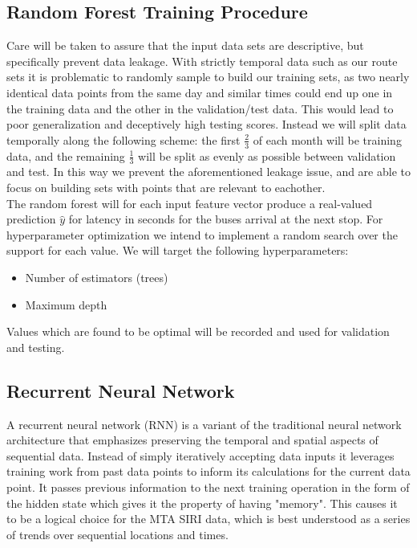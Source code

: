 \documentclass[sigconf]{acmart}
\begin{document}
\subsection{Random Forest Training Procedure}
Care will be taken to assure that the input data sets are descriptive, but specifically prevent data leakage. With strictly temporal data such as our route sets it is problematic to randomly sample to build our training sets, as two nearly identical data points from the same day and similar times could end up one in the training data and the other in the validation/test data. This would lead to poor generalization and deceptively high testing scores. Instead we will split data temporally along the following scheme: the first $\frac{2}{3}$ of each month will be training data, and the remaining $\frac{1}{3}$ will be split as evenly as possible between validation and test. In this way we prevent the aforementioned leakage issue, and are able to focus on building sets with points that are relevant to eachother.\\
The random forest will for each input feature vector produce a real-valued prediction $\hat{y}$ for latency in seconds for the buses arrival at the next stop.
For hyperparameter optimization we intend to implement a random search over the support for each value. We will target the following hyperparameters:
\begin{itemize}
    \item Number of estimators (trees)
    \item Maximum depth
\end{itemize}
Values which are found to be optimal will be recorded and used for validation and testing.


\subsection{Recurrent Neural Network}
A recurrent neural network (RNN) is a variant of the traditional neural network architecture that emphasizes preserving the temporal and spatial aspects of sequential data. Instead of simply iteratively accepting data inputs it leverages training work from past data points to inform its calculations for the current data point. It passes previous information to the next training operation in the form of the hidden state which gives it the property of having "memory". This causes it to be a logical choice for the MTA SIRI data, which is best understood as a series of trends over sequential locations and times.
\end{document}
